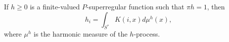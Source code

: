 If $h \geq 0$ is a finite-valued $P$-superregular function such that $\pi h = 1$, then
$$h_i = \int_{S^*} K(i, x) d\mu^h(x),$$
where $\mu^h$ is the harmonic measure of the $h$-process.
